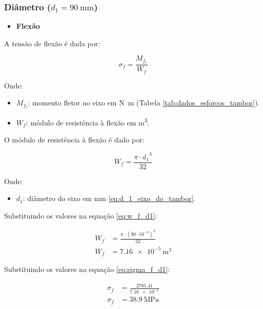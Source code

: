 \subsubsection{Diâmetro ($d_1 = \SI{90}{\milli\meter}$)}

\begin{itemize}
  \item \textbf{Flexão}
\end{itemize}

A tensão de flexão é dada por:

\begin{equation}
  \sigma_f = \frac{M_{f_e}}{W_f}
  \label{eq:sigma_f_d1}
\end{equation}

Onde:

\begin{itemize}
  \item $M_{f_e}$: momento fletor no eixo em \si{\newton\meter} (Tabela \ref{tab:dados_esforcos_tambor}).
  \item $W_f$: módulo de resistência à flexão em \si{\meter^3}.
\end{itemize}

\vspace{1em}

O módulo de resistência à flexão é dado por:

\begin{equation}
  W_f = \frac{\pi \cdot {d_1}^3}{32}
  \label{eq:w_f_d1}
\end{equation}

Onde:

\begin{itemize}
  \item $d_1$: diâmetro do eixo em \si{\milli\meter} \eqref{eq:d_1_eixo_do_tambor}.
\end{itemize}

\vspace{1em}

Substituindo os valores na equação \eqref{eq:w_f_d1}:

\begin{align*}
  W_f & = \frac{\pi \cdot {\left( 90 \cdot 10^{-3} \right)}^3}{32} \\
  W_f & = \boxed{\SI{7.16e-5}{\meter^3}}
\end{align*}

Substituindo os valores na equação \eqref{eq:sigma_f_d1}:

\begin{align*}
  \sigma_f & = \frac{\num{2785.41}}{\num{7.16e-5}} \\
  \sigma_f & = \boxed{\SI{38.9}{\mega\pascal}}
\end{align*}

